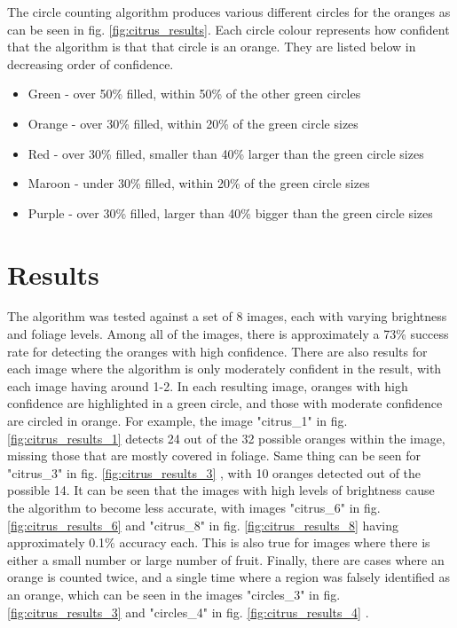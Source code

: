 \documentclass[conference]{IEEEtran}
\begin{document}
The circle counting algorithm produces various different circles for the oranges as can be seen in fig. \ref{fig:citrus_results}. Each circle colour represents how confident that the algorithm is that that circle is an orange. They are listed below in decreasing order of confidence.

\begin{itemize}
\item Green - over 50\% filled, within 50\% of the other green circles
\item Orange - over 30\% filled, within 20\% of the green circle sizes
\item Red - over 30\% filled, smaller than 40\% larger than the green circle sizes
\item Maroon - under 30\% filled,  within 20\% of the green circle sizes
\item Purple - over 30\% filled, larger  than 40\% bigger than the green circle sizes
\end{itemize}


\section{Results}


The algorithm was tested against a set of 8 images, each with varying brightness and foliage levels. Among all of the images, there is approximately a 73\% success rate for detecting the oranges with high confidence. There are also results for each image where the algorithm is only moderately confident in the result, with each image having around 1-2. In each resulting image, oranges with high confidence are highlighted in a green circle, and those with moderate confidence are circled in orange. For example, the image "citrus\_1" in fig. \ref{fig:citrus_results_1} detects 24 out of the 32 possible oranges within the image, missing those that are mostly covered in foliage. Same thing can be seen for "citrus\_3" in fig. \ref{fig:citrus_results_3} , with 10 oranges detected out of the possible 14. It can be seen that the images with high levels of brightness cause the algorithm to become less accurate, with images "citrus\_6"  in fig.\ref{fig:citrus_results_6} and "citrus\_8" in fig. \ref{fig:citrus_results_8}  having approximately 0.1\% accuracy each. This is also true for images where there is either a small number or large number of fruit. Finally, there are cases where an orange is counted twice, and a single time where a region was falsely identified as an orange, which can be seen in the images "circles\_3" in fig. \ref{fig:citrus_results_3} and "circles\_4" in fig. \ref{fig:citrus_results_4} .
\end{document}
